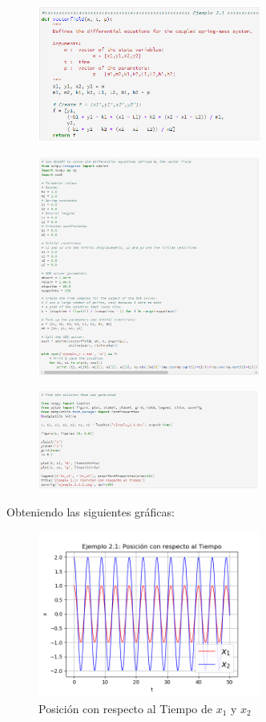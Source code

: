 \documentclass[a4paper]{article}
\begin{document}
\begin{figure}[ht!]
 \centering
  \includegraphics[width=0.65\textwidth]{Codigo1.PNG}
\end{figure}
\pagebreak
\begin{figure}[ht!]
 \centering
  \includegraphics[width=0.65\textwidth]{Codigo2.PNG}
\end{figure}
\begin{figure}[ht!]
 \centering
  \includegraphics[width=0.65\textwidth]{Codigo3.PNG}
\end{figure}
Obteniendo las siguientes gráficas:
\begin{figure}[h!]
 \centering
  \includegraphics[width=0.65\textwidth]{ejemplo_2_1_1.png}
  \caption{Posición con respecto al Tiempo de $x_1$ y $x_2$}
\end{figure}
\end{document}
